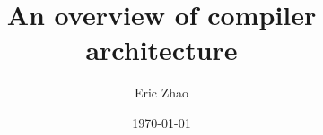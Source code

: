 \documentclass[xcolor={dvipsnames},xtable]{beamer}
\title{An overview of compiler architecture}
\subtitle{}
\date{\today}
\author{Eric Zhao}
\begin{document}

\newcommand{\sectiontitle}{}
\newcommand{\currenttitle}{}

\maketitle

\newcommand{\subdir}{sections}
\newcommand{\codedir}{listings}



\end{document}
